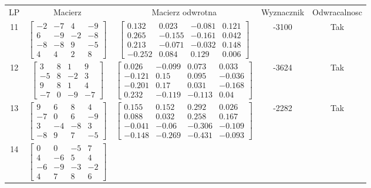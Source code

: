 \documentclass[a4paper,12pt]{article}
\begin{document}
\bgroup {} \vspace{0.2in} \begin{tabular}{c c c c c}
LP & Macierz & Macierz odwrotna & Wyznacznik & Odwracalnosc\\
11
&
$\begin{bmatrix} -2 & -7 & 4 & -9 \\ 6 & -9 & -2 & -8 \\ -8 & -8 & 9 & -5 \\ 4 & 4 & 2 & 8 \end{bmatrix}$
&
$\begin{bmatrix} 0.132 & 0.023 & -0.081 & 0.121 \\ 0.265 & -0.155 & -0.161 & 0.042 \\ 0.213 & -0.071 & -0.032 & 0.148 \\ -0.252 & 0.084 & 0.129 & 0.006 \end{bmatrix}$
&
-3100
&
Tak
\\
12
&
$\begin{bmatrix} 3 & 8 & 1 & 9 \\ -5 & 8 & -2 & 3 \\ 9 & 8 & 1 & 4 \\ -7 & 0 & -9 & -7 \end{bmatrix}$
&
$\begin{bmatrix} 0.026 & -0.099 & 0.073 & 0.033 \\ -0.121 & 0.15 & 0.095 & -0.036 \\ -0.201 & 0.17 & 0.031 & -0.168 \\ 0.232 & -0.119 & -0.113 & 0.04 \end{bmatrix}$
&
-3624
&
Tak
\\
13
&
$\begin{bmatrix} 9 & 6 & 8 & 4 \\ -7 & 0 & 6 & -9 \\ 3 & -4 & -8 & 3 \\ -8 & 9 & 7 & -5 \end{bmatrix}$
&
$\begin{bmatrix} 0.155 & 0.152 & 0.292 & 0.026 \\ 0.088 & 0.032 & 0.258 & 0.167 \\ -0.041 & -0.06 & -0.306 & -0.109 \\ -0.148 & -0.269 & -0.431 & -0.093 \end{bmatrix}$
&
-2282
&
Tak
\\
14
&
$\begin{bmatrix} 0 & 0 & -5 & 7 \\ 4 & -6 & 5 & 4 \\ -6 & -9 & -3 & -2 \\ 4 & 7 & 8 & 6 \end{bmatrix}$

\end{tabular}
\end{document}
